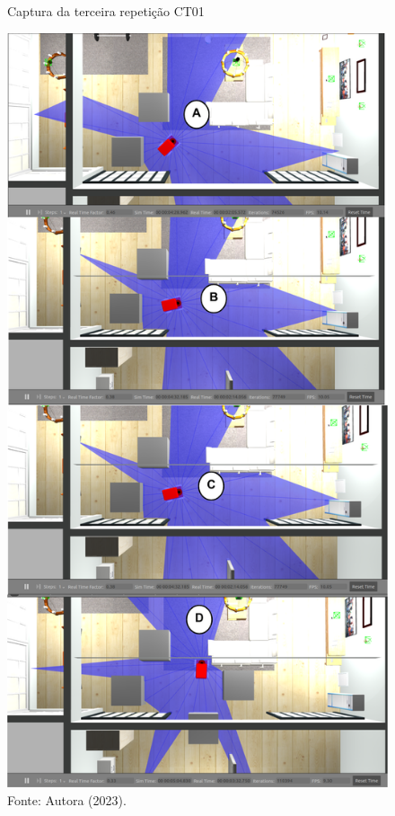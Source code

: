 \begin{figure}[H]
    \centering
    \caption{Captura da terceira repetição CT01}
    \includegraphics[scale=0.35]{ct01_3.png}
    \caption*{Fonte: Autora (2023).}
    \label{fig:ct01_3}
\end{figure}

